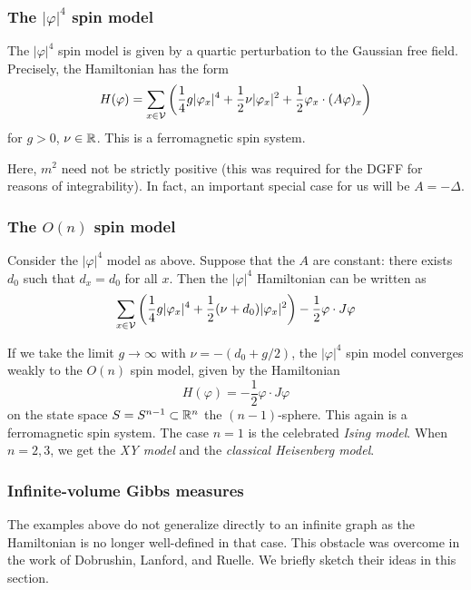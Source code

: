 \subsubsection{The $|\varphi|^4$ spin model}

The $|\varphi|^4$ spin model is given by a quartic perturbation to the Gaussian free field.
Precisely, the Hamiltonian has the form
\begin{equation}
H(\varphi)
  =
\sum_{x\in\mathcal{V}}
\left(
  \frac{1}{4} g |\varphi_x|^4
    +
  \frac{1}{2} \nu |\varphi_x|^2
    +
  \frac{1}{2} \varphi_x \cdot (A \varphi)_x
\right)
\end{equation}
for $g > 0$, $\nu\in{\mathbb R}$. This is a ferromagnetic spin system.

Here, $m^2$ need not be strictly positive (this was required for the DGFF for reasons of
integrability). In fact, an important special case for us will be $A = -\Delta$.


\subsubsection{The $O(n)$ spin model}

Consider the $|\varphi|^4$ model as above. Suppose that the $A$ are constant:
there exists $d_0$ such that $d_x = d_0$ for all $x$.
Then the $|\varphi|^4$ Hamiltonian can be written as
\begin{equation}
\sum_{x\in\mathcal{V}}
\left(
  \frac{1}{4} g |\varphi_x|^4
    +
  \frac{1}{2} (\nu + d_0) |\varphi_x|^2
\right)
  -
\frac{1}{2} \varphi \cdot J \varphi
\end{equation}

If we take the limit $g\to\infty$ with $\nu = -(d_0 + g / 2)$, the
$|\varphi|^4$ spin model converges
weakly to the $O(n)$ spin model, given by the Hamiltonian
\begin{equation}
H(\varphi) = -\frac{1}{2} \varphi \cdot J \varphi
\end{equation}
on the state space $S = S^{n-1} \subset {\mathbb R}^n$ the $(n-1)$-sphere.
This again is a ferromagnetic spin system.
The case $n = 1$ is the celebrated \emph{Ising model}. When $n = 2, 3$,
we get the \emph{XY model} and the \emph{classical Heisenberg model}.


\subsubsection{Infinite-volume Gibbs measures}

The examples above do not generalize directly to an infinite graph as
the Hamiltonian is no longer well-defined in that case. This obstacle was overcome in the work
of Dobrushin, Lanford, and Ruelle. We briefly sketch their ideas in this section.

